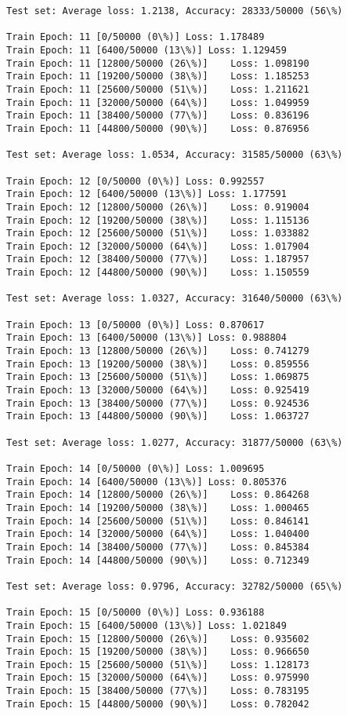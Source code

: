 \documentclass[11pt]{article}
\begin{document}
\begin{Verbatim}[commandchars=\\\{\}]
Test set: Average loss: 1.2138, Accuracy: 28333/50000 (56\%)

Train Epoch: 11 [0/50000 (0\%)]	Loss: 1.178489
Train Epoch: 11 [6400/50000 (13\%)]	Loss: 1.129459
Train Epoch: 11 [12800/50000 (26\%)]	Loss: 1.098190
Train Epoch: 11 [19200/50000 (38\%)]	Loss: 1.185253
Train Epoch: 11 [25600/50000 (51\%)]	Loss: 1.211621
Train Epoch: 11 [32000/50000 (64\%)]	Loss: 1.049959
Train Epoch: 11 [38400/50000 (77\%)]	Loss: 0.836196
Train Epoch: 11 [44800/50000 (90\%)]	Loss: 0.876956

Test set: Average loss: 1.0534, Accuracy: 31585/50000 (63\%)

Train Epoch: 12 [0/50000 (0\%)]	Loss: 0.992557
Train Epoch: 12 [6400/50000 (13\%)]	Loss: 1.177591
Train Epoch: 12 [12800/50000 (26\%)]	Loss: 0.919004
Train Epoch: 12 [19200/50000 (38\%)]	Loss: 1.115136
Train Epoch: 12 [25600/50000 (51\%)]	Loss: 1.033882
Train Epoch: 12 [32000/50000 (64\%)]	Loss: 1.017904
Train Epoch: 12 [38400/50000 (77\%)]	Loss: 1.187957
Train Epoch: 12 [44800/50000 (90\%)]	Loss: 1.150559

Test set: Average loss: 1.0327, Accuracy: 31640/50000 (63\%)

Train Epoch: 13 [0/50000 (0\%)]	Loss: 0.870617
Train Epoch: 13 [6400/50000 (13\%)]	Loss: 0.988804
Train Epoch: 13 [12800/50000 (26\%)]	Loss: 0.741279
Train Epoch: 13 [19200/50000 (38\%)]	Loss: 0.859556
Train Epoch: 13 [25600/50000 (51\%)]	Loss: 1.069875
Train Epoch: 13 [32000/50000 (64\%)]	Loss: 0.925419
Train Epoch: 13 [38400/50000 (77\%)]	Loss: 0.924536
Train Epoch: 13 [44800/50000 (90\%)]	Loss: 1.063727

Test set: Average loss: 1.0277, Accuracy: 31877/50000 (63\%)

Train Epoch: 14 [0/50000 (0\%)]	Loss: 1.009695
Train Epoch: 14 [6400/50000 (13\%)]	Loss: 0.805376
Train Epoch: 14 [12800/50000 (26\%)]	Loss: 0.864268
Train Epoch: 14 [19200/50000 (38\%)]	Loss: 1.000465
Train Epoch: 14 [25600/50000 (51\%)]	Loss: 0.846141
Train Epoch: 14 [32000/50000 (64\%)]	Loss: 1.040400
Train Epoch: 14 [38400/50000 (77\%)]	Loss: 0.845384
Train Epoch: 14 [44800/50000 (90\%)]	Loss: 0.712349

Test set: Average loss: 0.9796, Accuracy: 32782/50000 (65\%)

Train Epoch: 15 [0/50000 (0\%)]	Loss: 0.936188
Train Epoch: 15 [6400/50000 (13\%)]	Loss: 1.021849
Train Epoch: 15 [12800/50000 (26\%)]	Loss: 0.935602
Train Epoch: 15 [19200/50000 (38\%)]	Loss: 0.966650
Train Epoch: 15 [25600/50000 (51\%)]	Loss: 1.128173
Train Epoch: 15 [32000/50000 (64\%)]	Loss: 0.975990
Train Epoch: 15 [38400/50000 (77\%)]	Loss: 0.783195
Train Epoch: 15 [44800/50000 (90\%)]	Loss: 0.782042


\end{Verbatim}
\end{document}
